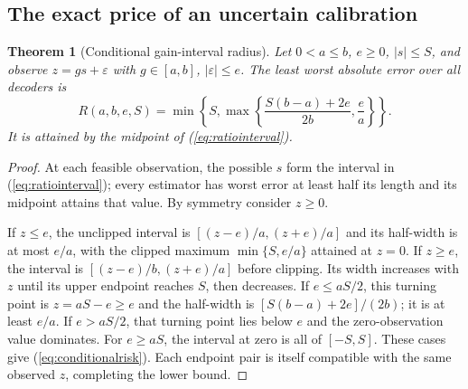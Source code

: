 \documentclass[11pt,letterpaper]{article}
\newtheorem{theorem}{Theorem}[section]
\theoremstyle{definition}\newtheorem{definition}[theorem]{Definition}
\theoremstyle{remark}\newtheorem{remark}[theorem]{Remark}
\begin{document}
\subsection{The exact price of an uncertain calibration}
\begin{theorem}[Conditional gain-interval radius]
\label{thm:conditional}
Let $0<a\le b$, $e\ge0$, $|s|\le S$, and observe $z=gs+\varepsilon$ with $g\in[a,b]$, $|\varepsilon|\le e$. The least worst absolute error over all decoders is
\begin{equation}
 R(a,b,e,S)=\min\left\{S,\max\left\{\frac{S(b-a)+2e}{2b},\frac ea\right\}\right\}.
 \label{eq:conditionalrisk}
\end{equation}
It is attained by the midpoint of (\ref{eq:ratiointerval}).
\end{theorem}
\begin{proof}
At each feasible observation, the possible $s$ form the interval in (\ref{eq:ratiointerval}); every estimator has worst error at least half its length and its midpoint attains that value. By symmetry consider $z\ge0$.

If $z\le e$, the unclipped interval is $[(z-e)/a,(z+e)/a]$ and its half-width is at most $e/a$, with the clipped maximum $\min\{S,e/a\}$ attained at $z=0$. If $z\ge e$, the interval is $[(z-e)/b,(z+e)/a]$ before clipping. Its width increases with $z$ until its upper endpoint reaches $S$, then decreases. If $e\le aS/2$, this turning point is $z=aS-e\ge e$ and the half-width is $[S(b-a)+2e]/(2b)$; it is at least $e/a$. If $e>aS/2$, that turning point lies below $e$ and the zero-observation value dominates. For $e\ge aS$, the interval at zero is all of $[-S,S]$. These cases give (\ref{eq:conditionalrisk}). Each endpoint pair is itself compatible with the same observed $z$, completing the lower bound.
\end{proof}
\end{document}
